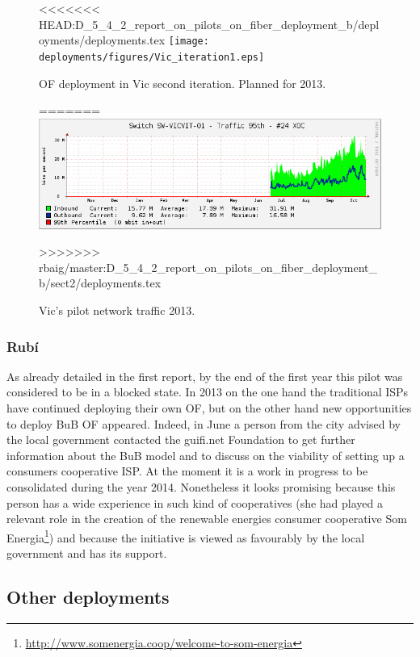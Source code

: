 \begin{figure}[H]
  \centering
<<<<<<< HEAD:D_5_4_2_report_on_pilots_on_fiber_deployment_b/deployments/deployments.tex
  \texttt{[image: deployments/figures/Vic\_iteration1.eps]} 
  \caption{OF deployment in Vic second iteration. Planned for 2013.}
  \label{fig:vic_it1}
=======
  \includegraphics[width=0.95\linewidth]{sect2/figures/vic_2013_transit.png}
  \caption[Vic pilot: Network traffic 2013]{Vic's pilot network traffic 2013.}
  \label{fig:vic_2013_transit}
>>>>>>> rbaig/master:D_5_4_2_report_on_pilots_on_fiber_deployment_b/sect2/deployments.tex
\end{figure}


\FloatBarrier
\subsubsection{Rub\'{i}}
\label{dep_rubi}

As already detailed in the first report, by the end of the first year this pilot was considered to be in a blocked state. In 2013 on the one hand the traditional ISPs have continued deploying their own OF, but on the other hand new opportunities to deploy BuB OF appeared. Indeed, in June a person from the city advised by the local government contacted the guifi.net Foundation to get further information about the BuB model and to discuss on the viability of setting up a consumers cooperative ISP. At the moment it is a work in progress to be consolidated during the year 2014. Nonetheless it looks promising because this person has a wide experience in such kind of cooperatives (she had played a relevant role in the creation of the renewable energies consumer cooperative Som Energia\footnote{\url{http://www.somenergia.coop/welcome-to-som-energia}}) and because the initiative is viewed as favourably by the local government and has its support.


\FloatBarrier
\subsection{Other deployments}
\label{dep_other}

